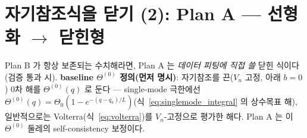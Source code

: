 \documentclass[11pt,a4paper]{article}
\begin{document}
\section{자기참조식을 닫기 (2): Plan A — 선형화 $\to$ 닫힌형}\label{sec:planA}
Plan B 가 항상 보존되는 수치해라면, Plan A 는 \emph{데이터 피팅에 직접 쓸} 닫힌 식이다(검증 통과 시). \textbf{baseline
$\Theta^{(0)}$ 정의(먼저 명시)}: 자기참조를 끈($V_n$ 고정, 아래 $b=0$) 0차 해를 $\Theta^{(0)}(q)$ 로 둔다 —
single-mode 극한에선 $\Theta^{(0)}(q)=\Theta_0(1-e^{-(q-q_a)/L})$(식~\eqref{eq:singlemode_integral} 의 상수목표
해), 일반적으로는 Volterra(식~\eqref{eq:volterra})를 $V_n$-고정으로 평가한 해다. Plan A 는 이 $\Theta^{(0)}$ 둘레의
self-consistency 보정이다.
\end{document}
